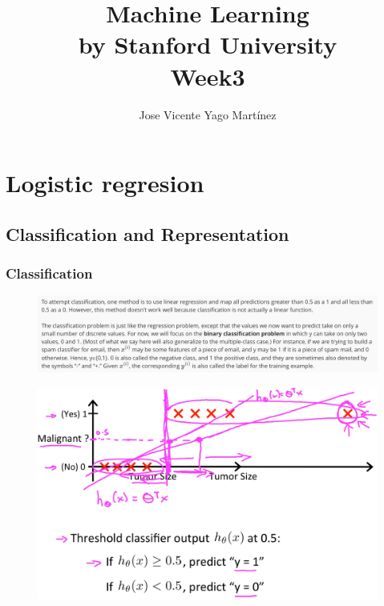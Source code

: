 \documentclass[12pt, A4,onecolumn]{article} %
\title{\textbf{Machine Learning\\ 
\small{by Stanford University}\\
Week3
}}
\author{
Jose Vicente Yago Martínez
}%
\begin{document}
\maketitle







\newpage
\tableofcontents

\newpage

\section{Logistic regresion}
\subsection{Classification and Representation}
\subsubsection{Classification}
\begin{figure}[H]
	\centering
	\includegraphics[width=1\textwidth]{./Imagenes/class1}
\end{figure}

\begin{figure}[H]
	\centering
	\includegraphics[width=1\textwidth]{./Imagenes/class2}
\end{figure}
\end{document}
